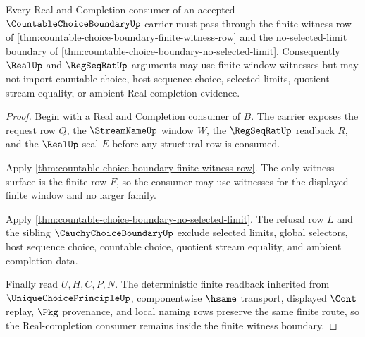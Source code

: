 \begin{theorem}
\label{thm:countable-choice-boundary-real-completion-discipline}
Every Real and Completion consumer of an accepted $\CountableChoiceBoundaryUp$ carrier must pass through the finite witness row of \autoref{thm:countable-choice-boundary-finite-witness-row} and the no-selected-limit boundary of \autoref{thm:countable-choice-boundary-no-selected-limit}. Consequently $\RealUp$ and $\RegSeqRatUp$ arguments may use finite-window witnesses but may not import countable choice, host sequence choice, selected limits, quotient stream equality, or ambient Real-completion evidence.
\end{theorem}
\begin{proof}
Begin with a Real and Completion consumer of $B$. The carrier exposes the request row $Q$, the $\StreamNameUp$ window $W$, the $\RegSeqRatUp$ readback $R$, and the $\RealUp$ seal $E$ before any structural row is consumed.

Apply \autoref{thm:countable-choice-boundary-finite-witness-row}. The only witness surface is the finite row $F$, so the consumer may use witnesses for the displayed finite window and no larger family.

Apply \autoref{thm:countable-choice-boundary-no-selected-limit}. The refusal row $L$ and the sibling $\CauchyChoiceBoundaryUp$ exclude selected limits, global selectors, host sequence choice, countable choice, quotient stream equality, and ambient completion data.

Finally read $U,H,C,P,N$. The deterministic finite readback inherited from $\UniqueChoicePrincipleUp$, componentwise $\hsame$ transport, displayed $\Cont$ replay, $\Pkg$ provenance, and local naming rows preserve the same finite route, so the Real-completion consumer remains inside the finite witness boundary.
\end{proof}

